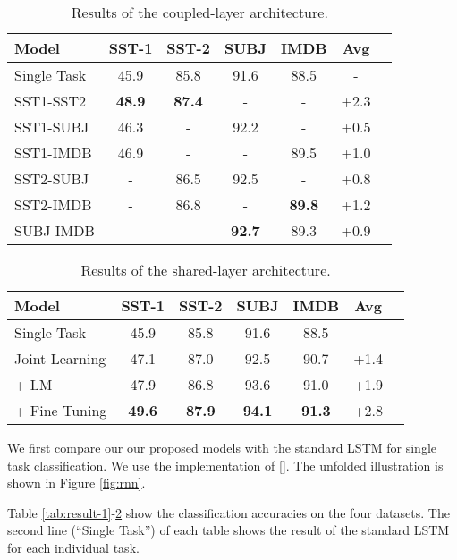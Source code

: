 \documentclass{article}
\newcommand\newcite[1]{\citeauthor{#1} [\citeyear{#1}]}
\begin{document}
\begin{table}[!th]\small
\center
\begin{tabular}{|l|*{6}{c|}}
\hline
\textbf{Model} &	 SST-1 &	 SST-2 &	SUBJ&	 IMDB  & Avg\\
\hline
Single Task &   45.9    &   85.8    &   91.6    &   88.5    & -\\
\hline
SST1-SST2 &   \textbf{48.9}    &   \textbf{87.4}    &   -    &   -    & +2.3\\
SST1-SUBJ &   46.3    &   -    &   92.2    &   -    & +0.5\\
SST1-IMDB &   46.9    &   -    &   -    &   89.5    & +1.0\\
SST2-SUBJ &   -    &   86.5    &   92.5    &   -    & +0.8\\
SST2-IMDB &   -    &   86.8    &   -    &   \textbf{89.8}    & +1.2\\
SUBJ-IMDB &   -    &   -    &   \textbf{92.7}    &   89.3    & +0.9\\
\hline
\end{tabular}
\caption{Results of the coupled-layer architecture.}\label{tab:result-2}
\end{table}


\begin{table}[!th]\small
\center
\begin{tabular}{|l|*{6}{c|}}
\hline
\textbf{Model} &	 SST-1 &	 SST-2 &	SUBJ&	 IMDB & Avg\\
\hline
Single Task &   45.9    &   85.8    &   91.6    &   88.5   & - \\
\hline
Joint Learning &   47.1    &   87.0    &   92.5    &   90.7 & +1.4   \\
+ LM &   47.9    &   86.8    &   93.6    &   91.0   & +1.9 \\
+ Fine Tuning &   \textbf{49.6}    &   \textbf{87.9}    &   \textbf{94.1}    &   \textbf{91.3}   & +2.8 \\
\hline
\end{tabular}
\caption{Results of the shared-layer architecture.}\label{tab:result-3}
\end{table}

We first compare our our proposed models with the standard LSTM for single task classification. We use the implementation
of \newcite{graves2013generating}. The unfolded illustration is shown in Figure \ref{fig:rnn}.

Table \ref{tab:result-1}-\ref{tab:result-3} show the classification accuracies on the four datasets. The second line (``Single Task'') of each table shows the result of the standard LSTM for each individual task.
\end{document}
